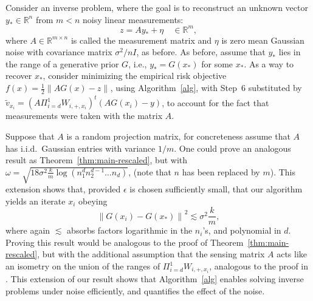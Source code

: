 \documentclass[11pt]{article}
\newcommand{\R}{\mathbb{R}}
\newcommand{\xo}{x_\ast}
\newcommand{\Tnorm}{}
\newcommand\norm[2][\Tnorm]{\ensuremath{{\left\|#2\right\|}_{#1}}}
\newcommand\stepdir[1]{\tilde v_{#1}}
\newcommand{\PiWdi}{\Pi_{i=d}^1 W_{i,+,x_i}}
\begin{document}
Consider an inverse problem, where the goal is to reconstruct an unknown vector $y_\ast \in \R^n$ from $m<n$ noisy linear measurements:
\[
z= A y_\ast + \eta
\quad \in \R^m,
\]
where $A \in \R^{m\times n}$ is called the measurement matrix and $\eta$ is zero mean Gaussian noise with covariance matrix $\sigma^2/n I$, as before.
As before, assume that $y_\ast$ lies in the range of a generative prior $G$, i.e., $y_\ast = G(\xo)$ for some $\xo$.
As a way to recover $\xo$, consider minimizing the empirical risk objective $f(x) = \frac{1}{2} \norm{A G(x) - z}$, using Algorithm~\ref{alg}, with Step~6 substituted by
$\stepdir{x_i} = (A\PiWdi)^t (AG(x_i) - y)$, to account for the fact that measurements were taken with the matrix $A$.

Suppose that $A$ is a random projection matrix, for concreteness assume that $A$ has i.i.d.~Gaussian entries with variance $1/m$.
One could prove an analogous result as Theorem~\ref{thm:main-rescaled}, but with $\omega = \sqrt{ 18\sigma^2 \frac{k}{m}
\log(n_1^d n_2^{d-1}\ldots n_d)}$, (note that $n$ has been replaced by $m$).  This extension shows that, provided $\epsilon$ is chosen sufficiently small, that our algorithm yields an iterate $x_i$ obeying
\[
\norm{G(x_i) - G(\xo)}^2
\lesssim
\sigma^2 \frac{k}{m},
\]
where again $\lesssim$ absorbs factors logarithmic in the $n_i$'s, and polynomial in $d$.  Proving this result would be analogous to the proof of Theorem~\ref{thm:main-rescaled}, but with the additional assumption that the sensing matrix $A$ acts like an isometry on the union of the ranges of $\PiWdi$, analogous to the proof in \citep{hand_global_2017}.
This extension of our result shows that Algorithm~\ref{alg} enables solving inverse problems under noise efficiently, and quantifies the effect of the noise.
\end{document}
